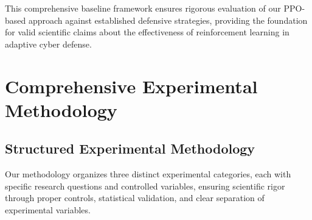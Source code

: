 \documentclass[12pt,oneside]{article}
\begin{document}

This comprehensive baseline framework ensures rigorous evaluation of our PPO-based approach against established defensive strategies, providing the foundation for valid scientific claims about the effectiveness of reinforcement learning in adaptive cyber defense.


\clearpage
\section{Comprehensive Experimental Methodology}

\subsection{Structured Experimental Methodology}

Our methodology organizes three distinct experimental categories, each with specific research questions and controlled variables, ensuring scientific rigor through proper controls, statistical validation, and clear separation of experimental variables.
\end{document}
